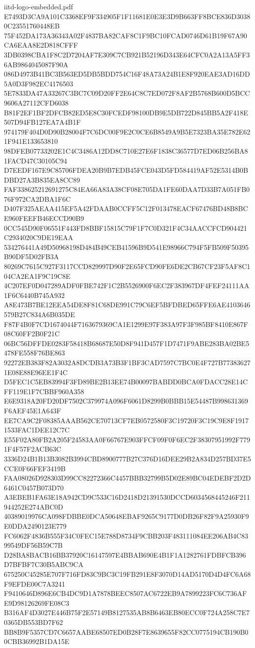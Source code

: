 \begin{filecontents*}[overwrite]{iitd-logo-embedded.pdf}
E7493D3CA9A101C3368EF9F334905F1F11681E0E3E3D9B663FF8BCE836D30380C23551760448EB
75F452DA173A36343A02F4837BA82CAF8C1F9BC10FCAD0746D61B19F67A90CA6EAA8E2D818CFFF
3DB0398CBA1F8C2D7204AF7E309C7CB921B52196D343E64CFC0A2A13A5FF36AB9864045087F90A
086D4973B41BC3B563ED5DB5BDD754C16F48A73A24B1E8F920EAE3AD16DD5A0D3F982EC4176503
5E7833DA47A33267C3BC7C09D20FF2E64C8C7ED072F8AF2B5768B600D5BCC9606A27112CFD6038
B81F2EF1BF2DFCB82ED5E8C30FCEDF98100DB9E5DB722D845BB5A2F418E507D94FB127EA7A4B1F
974179F404D0D90B28004F7C6DC00F9E2C0CE6B8549A9B5E7323BA35E782E621F941E133653810
98DFEB07733202E1C4C3486A12DD8C710E27E6F1838C36577D7ED06B256BA81FACD47C30105C94
D7EEDF167E9C85706FDEA20B9B7EDB45FCE043D5FD584419AF52E5314B0BDBD27A3B835EA8CC89
FAF338625212691275C84EA66A83A38CF08E705DA1FE60DAA7D33B7A051FB076F972CA2DBA1F6C
D407F325AEAA415EF5A42FDAAB0CCFF5C12F013478EACF67476BD48B8BCE960FEEFB46ECCD90B9
0CC545D90F06551F443FD8BBF15815C79F1F7C0D321F4C34AACCFCD904421C2934020C9DE19EAA
534276441A49D50968198D484B49CEB41596B9D541E98966C794F5FB509F50395B90DF5D02FB3A
80269C7615C927F3117CCD829997D90F2E65FCD90FE6DE2CB67CF23F5AF8C104CA2EA1F9C19C8E
4C207EF0D047289ADF0FBE742F1C2B5526900F6EC2F383967DF4FEF24111AA1F6C6440B745A932
A8E473B7BE12EEA54DE8F81C68DE991C79C6EF5BFDBED65FFE6AE4103646579B27C834A6B035DE
F87F4B0F7CD1674044F7163679369CA1E1299E97F383A97F3F985BF8410E867F08C60FF2B0F21C
06BC56DFFDE0283F58418B68687E50D8F941D457F1D7471F9ABE283BA02BE5478FE558F76BE863
92272EB383F82A3032A8DCDB3A73B3F1BF3CAD7597C7BC0E4F727B773836271E08E88E96EE1F4C
D5FEC1C5EB83994F3FD89BE2B13EE74B00097BABDD0BCA0FDACC28E14CFF119E1F7CBBF960A358
E6E9318A20FD20DF7502C379974A096F6061D8299B0BBB15E54487B998631369F6AEF45E1A643F
EE7CA9C2F08385AAAB562CE70713CF7EB0572580F3C19720F3C19C9E8F19171533FAC1DEE12C7C
E55F02A80FB2A205F24583AA0F66767E903FFCF09F0F6EC2F38307951992F7791F4F57F2ACB63C
3336D24B1B13B3082B3994CBD8900777B27C376D16DEE29B2A834D257BD37E5CCE0F66FEF3419B
FAA08026D928303D99CC82272366C4457BBB32799B5D02E89BC04EDEBF2D2D6461C0457B073D70
A3EBEB1FA63E18A942CD9C533C16D2418D21391530DCCD6034568445246F211944252E274ABC0D
40389019976CA098FDBBE0DCA50648EBAF9265C9177D0DB26F82F9A25930F9E0DDA2490123E779
FC6062F4836B555F34C0FEC15E788D8734F9CBB203F483111084EE206AB4C8399549DF56B59C7B
D28BA8BACB16BB37920C16147597E4BBAB690E4B1F1A1282761FDBFCB396D7BFBF7C30B5ABC9CA
675250C45285E707F716FD83C9BC3C19FB291E8F3070D14AD5170D4D4FC6A68F9EFDE00C7A3241
F9410646D896E6CB4DC9D1A7878BEEC8507AC6722EB9A7899223FC6C736AFE9D98126269FE08C3
B316AF4D3027E446B75F2E57149B8127535AB8B6463EB80ECC0F724A258C7E70365DB553BD7F62
BB8B9F5357CD7C6657AABE68507ED0B28F7E8639655F82CC0775194CB190B00CBB36992B1DA15E

\end{filecontents*}
